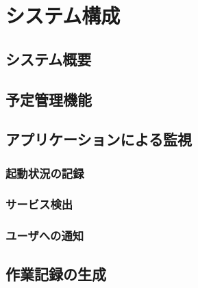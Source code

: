 \chapter{システム構成}

\section{システム概要}

\section{予定管理機能}

\section{アプリケーションによる監視}

\subsection{起動状況の記録}

\subsection{サービス検出}

\subsection{ユーザへの通知}

\section{作業記録の生成}



